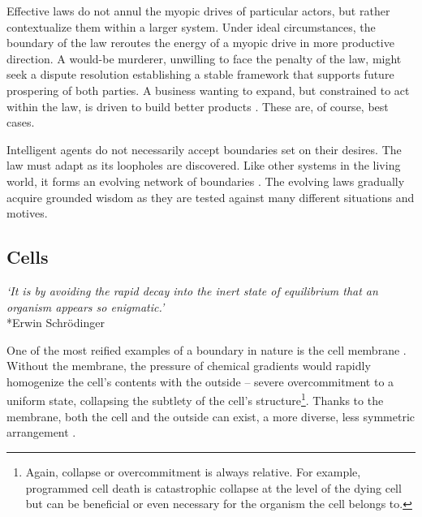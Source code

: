 \documentclass[12pt]{article}
\begin{document}
Effective laws do not annul the myopic drives of particular actors, but rather contextualize them within a larger system. Under ideal circumstances, the boundary of the law reroutes the energy of a myopic drive in more productive direction. A would-be murderer, unwilling to face the penalty of the law, might seek a dispute resolution establishing a stable framework that supports future prospering of both parties. A business wanting to expand, but constrained to act within the law, is driven to build better products \citep{wu2011master, ashford1985using, ambec2013porter}. These are, of course, best cases.

Intelligent agents do not necessarily accept boundaries set on their desires. The law must adapt as its loopholes are discovered. Like other systems in the living world, it forms an evolving network of boundaries \citep{campbell1979assessing, ordonez2009goals, kerr1975folly, burns2006impact}. The evolving laws gradually acquire grounded wisdom as they are tested against many different situations and motives.



\subsection{Cells}

\begin{center}
\textit{`It is by avoiding the rapid decay into the inert state of equilibrium that an organism appears so enigmatic.'}\\*Erwin Schrödinger
\end{center}



One of the most reified examples of a boundary in nature is the cell membrane \citep{watson2015biological, alberts2022molecular, bray2019wetware, harold2001way, lane2015vital}. Without the membrane, the pressure of chemical gradients would rapidly homogenize the cell's contents with the outside -- severe overcommitment to a uniform state, collapsing the subtlety of the cell's structure\footnote{Again, collapse or overcommitment is always relative. For example, programmed cell death is catastrophic collapse at the level of the dying cell but can be beneficial or even necessary for the organism the cell belongs to.}. Thanks to the membrane, both the cell and the outside can exist, a more diverse, less symmetric arrangement \citep{schrodinger1944what, anderson1972more, prigogine1984order, turing1952chemical}. 
\end{document}
